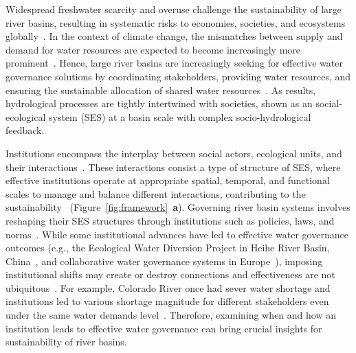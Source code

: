 Widespread freshwater scarcity and overuse challenge the sustainability of large river basins, resulting in systematic risks to economies, societies, and ecosystems globally~\cite{distefano2017, dolan2021, xu2020b, mekonnen2016}.
In the context of climate change, the mismatches between supply and demand for water resources are expected to become increasingly more prominent~\cite{florke2018, yoon2021}.
Hence, large river basins are increasingly seeking for effective water governance solutions by coordinating stakeholders, providing water resources, and ensuring the sustainable allocation of shared water resources~\cite{wang2019d}.
As results, hydrological processes are tightly intertwined with societies, shown as an social-ecological system (SES) at a basin scale with complex socio-hydrological feedback.

Institutions encompass the interplay between social actors, ecological units, and their interactions~\cite{lien2020, bodin2017b, wang2022g}.
These interactions consist a type of structure of SES, where effective institutions operate at appropriate spatial, temporal, and functional scales to manage and balance different interactions, contributing to the sustainability~\cite{epstein2015, wang2019d} (Figure~\ref{fig:framework}~\textbf{a}).
Governing river basin systems involves reshaping their SES structures through institutions such as policies, laws, and norms~\cite{young2008,cumming2020b}.
While some institutional advances have led to effective water governance outcomes (e.g., the Ecological Water Diversion Project in Heihe River Basin, China~\cite{wang2019d}, and collaborative water governance systems in Europe~\cite{green2013}),
imposing institutional shifts may create or destroy connections and effectiveness are not ubiquitous~\cite{loos2022}.
For example, Colorado River once had sever water shortage and institutions led to various shortage magnitude for different stakeholders even under the same water demands level~\cite{hadjimichael2020}.
Therefore, examining when and how an institution leads to effective water governance can bring crucial insights for sustainability of river basins.


